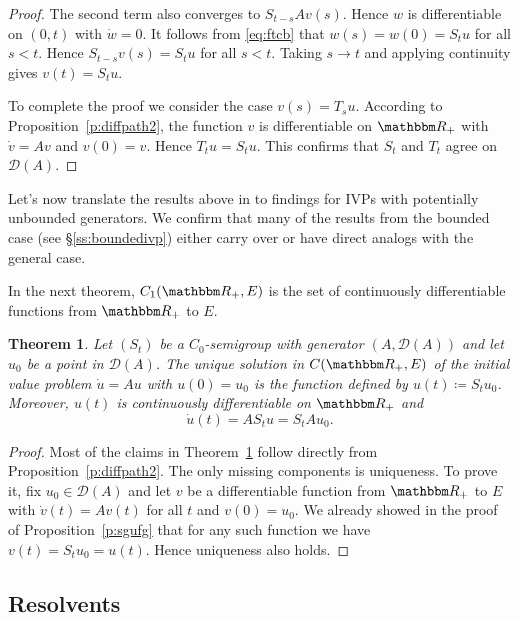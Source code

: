 \documentclass[12pt, reqno]{amsart}
\newcommand{\1}{\mathbbm 1}
\newcommand{\dD}{\mathcal D}
\newcommand{\RR}{\mathbbm R}
\theoremstyle{plain}
\newtheorem{theorem}{Theorem}[section]
\theoremstyle{definition}
\begin{document}
\begin{proof}
    The second term also converges to
    $S_{t-s} A v(s)$. Hence $w$ is differentiable on $(0, t)$ with $\dot w = 0$.
    It follows from \eqref{eq:ftcb} that $w(s) = w(0) = S_t u$ for all $s < t$.
    Hence $S_{t-s} v(s) = S_t u$ for all $s < t$.  Taking $s \to t$ and applying
    continuity gives $v(t) = S_t u$.  

    To complete the proof we consider the case $v(s) = T_s u$.  According to
    Proposition~\ref{p:diffpath2}, the function $v$ is differentiable on $\RR_+$
    with $\dot v = A v$ and $v(0) = v$. Hence $T_t u = S_t u$.
    This confirms that $S_t$ and $T_t$ agree on $\dD(A)$.
\end{proof}



Let's now translate the results above in to findings for IVPs with potentially
unbounded generators.  We confirm that many of the results from the bounded
case (see \S\ref{ss:boundedivp}) either carry over or have direct analogs with
the general case.

In the next theorem, $C_1(\RR_+, E)$ is the set of continuously differentiable
functions from $\RR_+$ to $E$.

\begin{theorem}\label{t:ivps}
    Let $(S_t)$ be a $C_0$-semigroup with generator $(A, \dD(A))$
    and let $u_0$ be a point in $\dD(A)$.  The unique solution in $C(\RR_+, E)$
    of the initial value problem $\dot u = A u$ with $u(0) = u_0$ is the
    function defined by $u(t) \coloneq S_t u_0$. Moreover, $u(t)$ is continuously
    differentiable on $\RR_+$ and 
    \begin{equation*}
       \dot u(t) = A S_t u = S_t A u_0.
    \end{equation*}
\end{theorem}

\begin{proof}
    Most of the claims in Theorem~\ref{t:ivps} follow directly from
    Proposition~\ref{p:diffpath2}.  The only missing components is uniqueness.
    To prove it, fix $u_0 \in \dD(A)$ and let $v$ be a differentiable function from
    $\RR_+$ to $E$ with $\dot v(t) = A v (t)$ for all $t$ and $v(0) = u_0$.
    We already showed in the proof of Proposition~\ref{p:sgufg} that for any
    such function we have $v(t) = S_t u_0 = u(t)$.  Hence uniqueness also holds.
\end{proof}



\subsection{Resolvents} 
\end{document}
